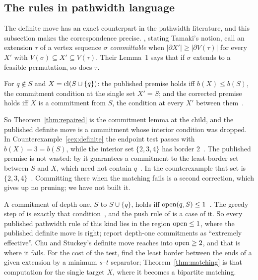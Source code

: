 \subsection{The rules in pathwidth language}
\label{sec:layouts}

The definite move has an exact counterpart in the pathwidth literature, and
this subsection makes the correspondence precise.
\citet[p.~142]{Kitsunai2016}, stating Tamaki's notion, call an extension $\tau$
of a vertex sequence $\sigma$ \emph{committable} when
$|\partial X'|\ge|\partial V(\tau)|$ for every $X'$ with
$V(\sigma)\subseteq X'\subseteq V(\tau)$. Their Lemma~1 says that if $\sigma$
extends to a feasible permutation, so does $\tau$.

\begin{lemma}\label{lem:endpoint}
For $q\notin S$ and $X=\mathrm{cl}(S\cup\{q\})$: the published premise holds iff
$b(X)\le b(S)$, the commitment condition at the single set $X'=S$; and the
corrected premise holds iff $X$ is a commitment from $S$, the condition at every
$X'$ between them~.
\end{lemma}

So Theorem~\ref{thm:repaired} is the commitment lemma at the child, and the
published definite move is a commitment whose interior condition was dropped.
In Counterexample~\ref{cex:definite} the endpoint test passes with
$b(X)=3=b(S)$, while the interior set $\{2,3,4\}$ has border
2~. The published premise is not wasted: by
\citet[Lemma~10, Cor.~2, pp.~148--149]{Kitsunai2016} it guarantees a
commitment to the least-border set between $S$ and $X$, which need not contain
$q$~. In the counterexample that set is
$\{2,3,4\}$~. Committing there when the matching fails is a
second correction, which gives up no pruning; we have not built it.

A commitment of depth one, $S$ to $S\cup\{q\}$, holds iff
$\mathrm{open}(q,S)\le1$~. The greedy step of
\citet[Lemma~3, p.~49]{CoudertMazauricNisse2014} is exactly that
condition~, and the push rule of
\citet[Rule~1, p.~330]{SuchanVillanger2009} is a case of it. So every published
pathwidth rule of this kind lies in the region $\mathrm{open}\le1$, where the published
definite move is right; \citet[p.~388, Table~2]{KobayashiKomuroTamaki2014}
report depth-one commitments as ``extremely effective''. Chu and Stuckey's
definite move reaches into $\mathrm{open}\ge2$, and that is where it fails. For the
cost of the test, \citet[Cor.~2]{Kitsunai2016} find the least border between
the ends of a given extension by a minimum $s$--$t$ separator;
Theorem~\ref{thm:matching} is that computation for the single target $X$, where
it becomes a bipartite matching.

